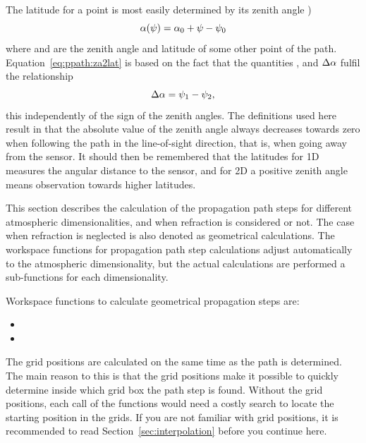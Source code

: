 The latitude for a point is most easily determined by its zenith angle
)
\begin{equation}
  \alpha(\psi) = \alpha_{0} + \psi - \psi_{0} 
  \label{eq:ppath:za2lat}
\end{equation}
where  and  are the zenith angle and latitude of some 
other point of the path. Equation~\ref{eq:ppath:za2lat} is based on the 
fact that the quantities ,  and $\Delta\alpha$
fulfil the relationship
\begin{equation}
  \Delta\alpha = \psi_{1} - \psi_{2},
\end{equation}
this independently of the sign of the zenith angles. The definitions
used here result in that the absolute value of the zenith angle always
decreases towards zero when following the path in the line-of-sight
direction, that is, when going away from the sensor. It should then be
remembered that the latitudes for 1D measures the angular distance to
the sensor, and for 2D a positive zenith angle means observation
towards higher latitudes.




\label{sec:ppath:stepcalc}

This section describes the calculation of the propagation path steps
for different atmospheric dimensionalities, and when refraction is
considered or not. The case when refraction is neglected is also
denoted as geometrical calculations. The workspace functions for
propagation path step calculations adjust automatically to the
atmospheric dimensionality, but the actual calculations are performed
a sub-functions for each dimensionality.

Workspace functions to calculate geometrical propagation steps are:
\begin{itemize}
\item {}
\item {}
\end{itemize}



The grid positions are calculated on the same time as the path is
determined. The main reason to this is that the grid positions make it
possible to quickly determine inside which grid box the path step is
found. Without the grid positions, each call of the functions would
need a costly search to locate the starting position in the grids.  If
you are not familiar with grid positions, it is recommended to read
Section~\ref{sec:interpolation} before you continue here.

